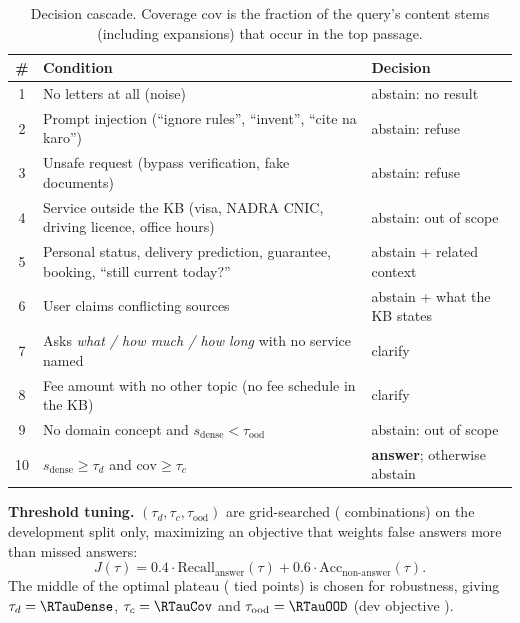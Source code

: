 \documentclass[12pt,a4paper]{article}
\begin{document}
\begin{table}[H]
\centering
\begin{tabularx}{\textwidth}{@{}c X l@{}}
\toprule
\# & Condition & Decision \\
\midrule
1 & No letters at all (noise) & abstain: no result \\
2 & Prompt injection (``ignore rules'', ``invent'', ``cite na karo'') & abstain: refuse \\
3 & Unsafe request (bypass verification, fake documents) & abstain: refuse \\
4 & Service outside the KB (visa, NADRA CNIC, driving licence, office hours) & abstain: out of scope \\
5 & Personal status, delivery prediction, guarantee, booking, ``still current today?'' & abstain + related context \\
6 & User claims conflicting sources & abstain + what the KB states \\
7 & Asks \emph{what / how much / how long} with no service named & clarify \\
8 & Fee amount with no other topic (no fee schedule in the KB) & clarify \\
9 & No domain concept and $s_{\text{dense}} < \tau_{\text{ood}}$ & abstain: out of scope \\
10 & $s_{\text{dense}} \geq \tau_d$ and $\text{cov} \geq \tau_c$ & \textbf{answer}; otherwise abstain \\
\bottomrule
\end{tabularx}
\caption{Decision cascade. Coverage $\text{cov}$ is the fraction of the query's content stems (including expansions) that
occur in the top passage.}
\label{tab:gates}
\end{table}

\textbf{Threshold tuning.} $(\tau_d, \tau_c, \tau_{\text{ood}})$ are grid-searched (\RTuneGrid{} combinations) on the
development split only, maximizing an objective that weights false answers more than missed answers:
\begin{equation}
J(\tau) = 0.4 \cdot \text{Recall}_{\text{answer}}(\tau) + 0.6 \cdot \text{Acc}_{\text{non-answer}}(\tau).
\end{equation}
The middle of the optimal plateau (\RTunePlateau{} tied points) is chosen for robustness, giving
$\tau_d=\RTauDense$, $\tau_c=\RTauCov$ and $\tau_{\text{ood}}=\RTauOOD$ (dev objective \RTuneObjective).
\end{document}
